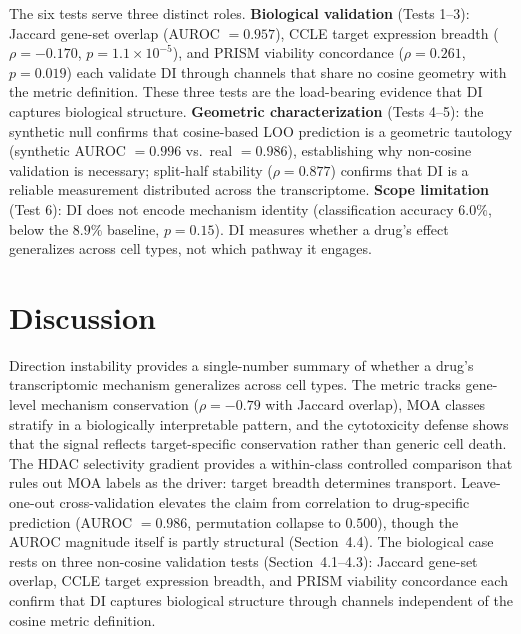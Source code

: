 \documentclass[11pt]{article}
\begin{document}
The six tests serve three distinct roles.  \textbf{Biological
validation} (Tests 1--3): Jaccard gene-set overlap (AUROC $= 0.957$),
CCLE target expression breadth ($\rho = -0.170$, $p = 1.1 \times
10^{-5}$), and PRISM viability concordance ($\rho = 0.261$, $p =
0.019$) each validate DI through channels that share no cosine geometry
with the metric definition.  These three tests are the load-bearing
evidence that DI captures biological structure.  \textbf{Geometric
characterization} (Tests 4--5): the synthetic null confirms that
cosine-based LOO prediction is a geometric tautology (synthetic AUROC $=
0.996$ vs.\ real $= 0.986$), establishing why non-cosine validation is
necessary; split-half stability ($\rho = 0.877$) confirms that DI is a
reliable measurement distributed across the transcriptome.
\textbf{Scope limitation} (Test 6): DI does not encode mechanism
identity (classification accuracy $6.0\%$, below the $8.9\%$ baseline,
$p = 0.15$).  DI measures whether a drug's effect generalizes across
cell types, not which pathway it engages.

\section{Discussion}

Direction instability provides a single-number summary of whether a
drug's transcriptomic mechanism generalizes across cell types.  The
metric tracks gene-level mechanism conservation ($\rho = -0.79$ with
Jaccard overlap), MOA classes stratify in a biologically interpretable
pattern, and the cytotoxicity defense shows that the signal reflects
target-specific conservation rather than generic cell death.  The HDAC
selectivity gradient provides a within-class controlled comparison
that rules out MOA labels as the driver: target breadth determines
transport.  Leave-one-out cross-validation elevates the claim from
correlation to drug-specific prediction (AUROC $= 0.986$, permutation
collapse to $0.500$), though the AUROC magnitude itself is partly
structural (Section~4.4).  The biological case rests on three
non-cosine validation tests (Section~4.1--4.3): Jaccard gene-set
overlap, CCLE target expression breadth, and PRISM viability
concordance each confirm that DI captures biological structure through
channels independent of the cosine metric definition.
\end{document}
